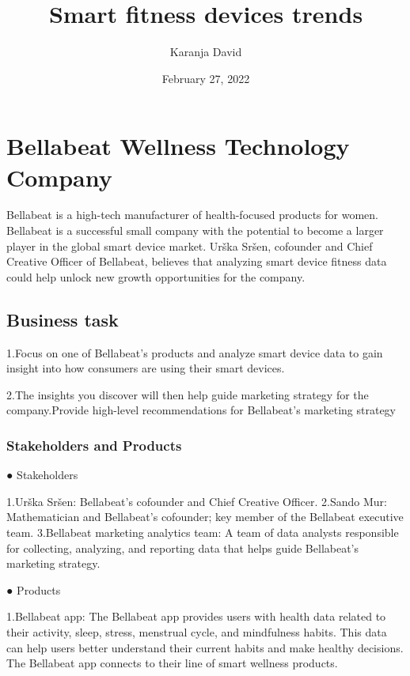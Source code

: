 \documentclass[
]{article}
\title{Smart fitness devices trends}
\author{Karanja David}
\date{February 27, 2022}
\begin{document}
\maketitle

\hypertarget{bellabeat-wellness-technology-company}{%
\section{Bellabeat Wellness Technology
Company}\label{bellabeat-wellness-technology-company}}

Bellabeat is a high-tech manufacturer of health-focused products for
women. Bellabeat is a successful small company with the potential to
become a larger player in the global smart device market. Urška Sršen,
cofounder and Chief Creative Officer of Bellabeat, believes that
analyzing smart device fitness data could help unlock new growth
opportunities for the company.

\hypertarget{business-task}{%
\subsection{Business task}\label{business-task}}

1.Focus on one of Bellabeat's products and analyze smart device data to
gain insight into how consumers are using their smart devices.

2.The insights you discover will then help guide marketing strategy for
the company.Provide high-level recommendations for Bellabeat's marketing
strategy

\hypertarget{stakeholders-and-products}{%
\subsubsection{Stakeholders and
Products}\label{stakeholders-and-products}}

● Stakeholders

1.Urška Sršen: Bellabeat's cofounder and Chief Creative Officer. 2.Sando
Mur: Mathematician and Bellabeat's cofounder; key member of the
Bellabeat executive team. 3.Bellabeat marketing analytics team: A team
of data analysts responsible for collecting, analyzing, and reporting
data that helps guide Bellabeat's marketing strategy.

● Products

1.Bellabeat app: The Bellabeat app provides users with health data
related to their activity, sleep, stress, menstrual cycle, and
mindfulness habits. This data can help users better understand their
current habits and make healthy decisions. The Bellabeat app connects to
their line of smart wellness products.
\end{document}

